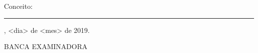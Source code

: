 \documentclass[
	12pt,				%
	openright,			%
	oneside,			%
	a4paper,			%
	english,			%
	brazil				%
	]{abntex2}
\begin{document}
%
% 
%
\begin{folhadeaprovacao}

  \begin{center}
    {\ABNTEXchapterfont\large\imprimirautor}

    \vspace*{\fill}\vspace*{\fill}
    \begin{center}
      \ABNTEXchapterfont\bfseries\Large\imprimirtitulo
    \end{center}
    \vspace*{\fill}
    
    \hspace{.45\textwidth}
    \begin{minipage}{.5\textwidth}
        \imprimirpreambulo
    \end{minipage}%
    \vspace*{\fill}
   \end{center}
        
   Conceito: \rule{3cm}{.1pt}
   
   \imprimirlocal, <dia> de <mes> de 2019.
   
   \vspace{1cm}
   \begin{center}
   BANCA EXAMINADORA
   \end{center}
    

      

  
\end{folhadeaprovacao}

\end{document}
